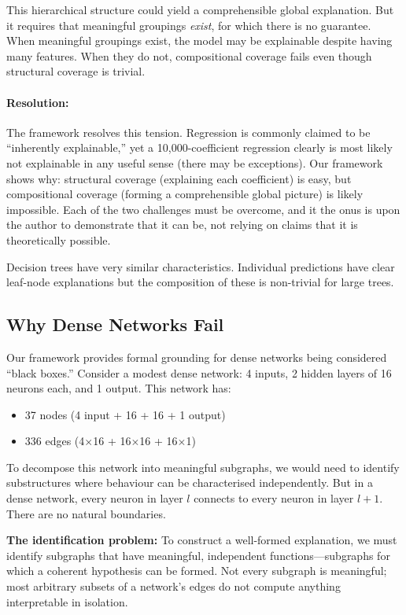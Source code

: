 \documentclass{article}
\begin{document}
This hierarchical structure could yield a comprehensible global explanation. But it requires that meaningful groupings \emph{exist}, for which there is no guarantee. When meaningful groupings exist, the model may be explainable despite having many features. When they do not, compositional coverage fails even though structural coverage is trivial.

\paragraph{Resolution:} The framework resolves this tension. Regression is commonly claimed to be ``inherently explainable,'' yet a 10,000-coefficient regression clearly is most likely not explainable in any useful sense (there may be exceptions). Our framework shows why: structural coverage (explaining each coefficient) is easy, but compositional coverage (forming a comprehensible global picture) is likely impossible. Each of the two challenges must be overcome, and it the onus is upon the author to demonstrate that it can be, not relying on claims that it is theoretically possible.

Decision trees have very similar characteristics. Individual predictions have clear leaf-node explanations but the composition of these is non-trivial for large trees. 

\subsection{Why Dense Networks Fail}

Our framework provides formal grounding for dense networks being considered ``black boxes.'' Consider a modest dense network: 4 inputs, 2 hidden layers of 16 neurons each, and 1 output. This network has:
\begin{itemize}
    \item 37 nodes (4 input + 16 + 16 + 1 output)
    \item 336 edges (4$\times$16 + 16$\times$16 + 16$\times$1)
\end{itemize}

To decompose this network into meaningful subgraphs, we would need to identify substructures where behaviour can be characterised independently. But in a dense network, every neuron in layer $l$ connects to every neuron in layer $l+1$. There are no natural boundaries.

\textbf{The identification problem:} To construct a well-formed 
explanation, we must identify subgraphs that have meaningful, 
independent functions---subgraphs for which a coherent hypothesis 
can be formed. Not every subgraph is meaningful; most arbitrary 
subsets of a network's edges do not compute anything interpretable 
in isolation.
\end{document}
